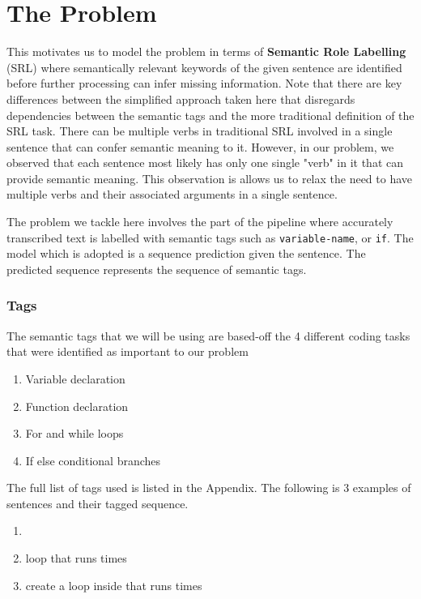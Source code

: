 \documentclass[fyp]{socreport}
\begin{document}
\section{The Problem}

This motivates us to model the problem in terms of \textbf{Semantic Role
Labelling} (SRL) where semantically relevant keywords of the given sentence are
identified before further processing can infer missing information. Note
that there are key differences between the simplified approach taken here
that disregards dependencies between the semantic tags and the more
traditional definition of the SRL task. There can be multiple verbs in traditional
SRL involved in a single sentence that can confer semantic meaning to it.
However, in our problem, we observed that each sentence most likely has only one
single "verb" in it that can provide semantic meaning. This observation is
allows us to relax the need to have multiple verbs and their associated
arguments in a single sentence.

The problem we tackle here involves the part of the pipeline where accurately
transcribed text is labelled with semantic tags such as \texttt{variable-name},
or \texttt{if}. The model which is adopted is a sequence prediction given
the sentence. The predicted sequence represents the sequence of semantic tags.

\subsubsection{Tags} The semantic tags that we will be using are based-off
the 4 different coding tasks that were identified as important to our problem

\begin{enumerate}
\setlength{\itemsep}{0pt}
\setlength{\parskip}{0pt}
  \item Variable declaration
  \item Function declaration
  \item For and while loops
  \item If else conditional branches
\end{enumerate}

The full list of tags used is listed in the Appendix. The following is 3 examples
of sentences and their tagged sequence.

\begin{enumerate}
\itemsep0em
  \item {}     
      
  \item {} loop that runs  times
  \item create a  loop inside that runs  times
\end{enumerate}
\end{document}
